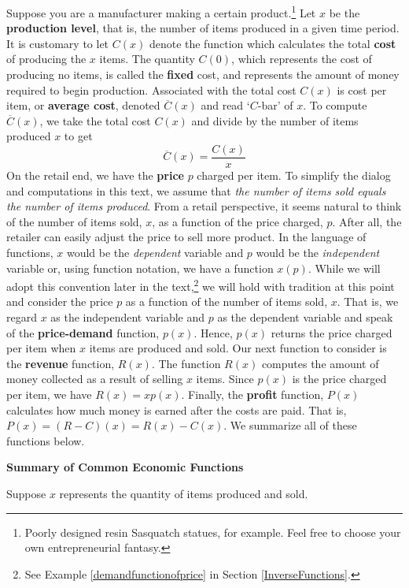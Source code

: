 \documentclass{ximera}
\begin{document}
Suppose you are a manufacturer making a certain product.\footnote{Poorly designed resin Sasquatch statues, for example.  Feel free to choose your own entrepreneurial fantasy.}  Let $x$ be the \textbf{production level}, that is, the number of items produced in a given time period. It is customary to let $C(x)$ denote the function which calculates the total \textbf{cost} of producing the $x$ items.  The quantity $C(0)$, which represents the cost of producing no items, is called the \textbf{fixed} cost, and represents the amount of money required to begin production. Associated with the total cost $C(x)$ is cost per item, or \textbf{average cost}, denoted $\overline{C}(x)$ and read `$C$-bar' of $x$.  To compute $\overline{C}(x)$,  we take the total cost $C(x)$ and divide by the number of items produced $x$ to get \[ \overline{C}(x) = \dfrac{C(x)}{x}\] On the retail end, we have the \textbf{price} $p$ charged per item.  To simplify the dialog and computations in this text, we assume that \textit{the number of items sold equals the number of items produced}. From a retail perspective, it seems natural to think of the number of items sold, $x$, as a function of the price charged, $p$.  After all, the retailer can easily adjust the price to sell more product.  In the language of functions,  $x$ would be the \textit{dependent} variable and $p$ would be the \textit{independent} variable or, using function notation, we have a function $x(p)$.  While we will adopt this convention later in the text,\footnote{See Example \ref{demandfunctionofprice} in Section \ref{InverseFunctions}.} we will hold with tradition at this point and consider the price $p$ as a function of the number of items sold, $x$.  That is, we regard $x$ as the independent variable and $p$ as the dependent variable and speak of the \textbf{price-demand} function, $p(x)$.  Hence, $p(x)$ returns the price charged per item when $x$ items are produced and sold.   Our next function to consider is the \textbf{revenue} function, $R(x)$.  The function $R(x)$ computes the amount of money collected as a result of selling $x$ items.  Since $p(x)$ is the price charged per item, we have $R(x)= x p(x)$.  Finally, the \textbf{profit} function, $P(x)$ calculates how much money is earned after the costs are paid.  That is, $P(x) = (R-C)(x) = R(x) - C(x)$.  We summarize all of these functions below.


\label{pricerevenuecostprofit}

\centerline{\textbf{Summary of Common Economic Functions}} 

 Suppose $x$ represents the quantity of items produced and sold.
\end{document}
